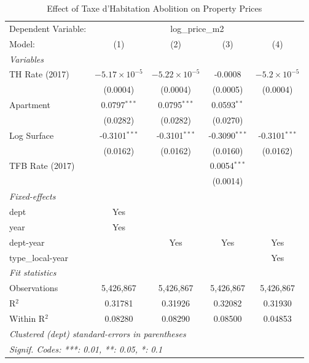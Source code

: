 \begin{table}[htbp]
   \caption{\label{tab:main} Effect of Taxe d'Habitation Abolition on Property Prices}
   \centering
   \begin{tabular}{lcccc}
      \tabularnewline \midrule \midrule
      Dependent Variable: & \multicolumn{4}{c}{log\_price\_m2}\\
      Model:            & (1)                    & (2)                    & (3)             & (4)\\  
      \midrule
      \emph{Variables}\\
      TH Rate (2017)    & $-5.17\times 10^{-5}$  & $-5.22\times 10^{-5}$  & -0.0008         & $-5.2\times 10^{-5}$\\    
                        & (0.0004)               & (0.0004)               & (0.0005)        & (0.0004)\\   
      Apartment         & 0.0797$^{***}$         & 0.0795$^{***}$         & 0.0593$^{**}$   &   \\   
                        & (0.0282)               & (0.0282)               & (0.0270)        &   \\   
      Log Surface       & -0.3101$^{***}$        & -0.3101$^{***}$        & -0.3090$^{***}$ & -0.3101$^{***}$\\   
                        & (0.0162)               & (0.0162)               & (0.0160)        & (0.0162)\\   
      TFB Rate (2017)   &                        &                        & 0.0054$^{***}$  &   \\   
                        &                        &                        & (0.0014)        &   \\   
      \midrule
      \emph{Fixed-effects}\\
      dept              & Yes                    &                        &                 & \\  
      year              & Yes                    &                        &                 & \\  
      dept-year         &                        & Yes                    & Yes             & Yes\\  
      type\_local-year  &                        &                        &                 & Yes\\  
      \midrule
      \emph{Fit statistics}\\
      Observations      & 5,426,867              & 5,426,867              & 5,426,867       & 5,426,867\\  
      R$^2$             & 0.31781                & 0.31926                & 0.32082         & 0.31930\\  
      Within R$^2$      & 0.08280                & 0.08290                & 0.08500         & 0.04853\\  
      \midrule \midrule
      \multicolumn{5}{l}{\emph{Clustered (dept) standard-errors in parentheses}}\\
      \multicolumn{5}{l}{\emph{Signif. Codes: ***: 0.01, **: 0.05, *: 0.1}}\\
   \end{tabular}
\end{table}
